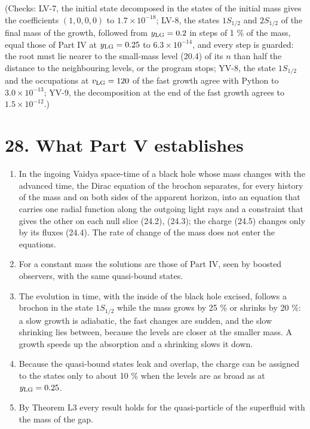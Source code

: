 \documentclass[
  10pt,
]{article}
\providecommand{\tightlist}{%
  \setlength{\itemsep}{0pt}\setlength{\parskip}{0pt}}
\begin{document}
(Checks: LV-7, the initial state decomposed in the states of the initial
mass gives the coefficients \((1,0,0,0)\) to \(1.7\times10^{-18}\);
LV-8, the states \(1S_{1/2}\) and \(2S_{1/2}\) of the final mass of the
growth, followed from \(y_{\rm LG}=0.2\) in steps of 1 \% of the mass,
equal those of Part IV at \(y_{\rm LG}=0.25\) to \(6.3\times10^{-14}\),
and every step is guarded: the root must lie nearer to the small-mass
level (20.4) of its \(n\) than half the distance to the neighbouring
levels, or the program stops; YV-8, the state \(1S_{1/2}\) and the
occupations at \(v_{\rm LG}=120\) of the fast growth agree with Python
to \(3.0\times10^{-13}\); YV-9, the decomposition at the end of the fast
growth agrees to \(1.5\times10^{-12}\).)

\hypertarget{what-part-v-establishes}{%
\section{28. What Part V establishes}\label{what-part-v-establishes}}

\begin{enumerate}
\def\labelenumi{\arabic{enumi}.}
\tightlist
\item
  In the ingoing Vaidya space-time of a black hole whose mass changes
  with the advanced time, the Dirac equation of the brochon separates,
  for every history of the mass and on both sides of the apparent
  horizon, into an equation that carries one radial function along the
  outgoing light rays and a constraint that gives the other on each null
  slice (24.2), (24.3); the charge (24.5) changes only by its fluxes
  (24.4). The rate of change of the mass does not enter the equations.
\item
  For a constant mass the solutions are those of Part IV, seen by
  boosted observers, with the same quasi-bound states.
\item
  The evolution in time, with the inside of the black hole excised,
  follows a brochon in the state \(1S_{1/2}\) while the mass grows by 25
  \% or shrinks by 20 \%: a slow growth is adiabatic, the fast changes
  are sudden, and the slow shrinking lies between, because the levels
  are closer at the smaller mass. A growth speeds up the absorption and
  a shrinking slows it down.
\item
  Because the quasi-bound states leak and overlap, the charge can be
  assigned to the states only to about 10 \% when the levels are as
  broad as at \(y_{\rm LG}=0.25\).
\item
  By Theorem L3 every result holds for the quasi-particle of the
  superfluid with the mass of the gap.
\end{enumerate}
\end{document}
